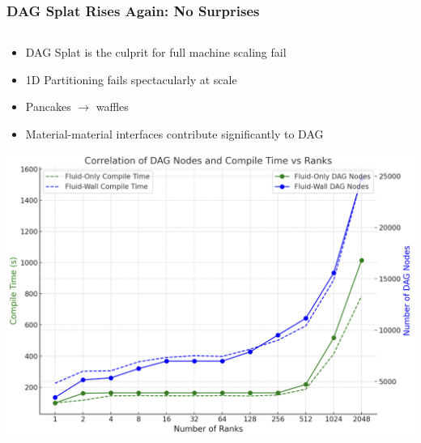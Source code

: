 \begin{frame}\frametitle{DAG Splat Rises Again: No Surprises}
    \begin{columns}[T]  %
    \begin{column}{0.5\textwidth}
      \begin{itemize}
      \item DAG Splat is the culprit for full machine scaling fail
      \item 1D Partitioning fails spectacularly at scale
      \item Pancakes $\rightarrow$ waffles
      \item Material-material interfaces contribute significantly to DAG
      \end{itemize}
      \vspace{20pt}
      \hspace{20pt}
      \includegraphics[width=.7\textwidth]{Figures/mtc/compile_times_dag_nodes.png}
    \end{column}
    

\end{columns}
\end{frame}
